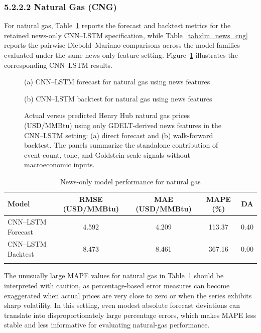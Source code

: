 \documentclass[pdflatex,sn-mathphys-num]{sn-jnl}%
\theoremstyle{thmstyleone}%
\theoremstyle{thmstyletwo}%
\theoremstyle{thmstylethree}%
\begin{document}
\subsubsection*{5.2.2.2 Natural Gas (CNG)}
For natural gas, Table~\ref{tab:news_only_cng} reports the forecast and backtest metrics for the retained news-only CNN--LSTM specification, while Table~\ref{tab:dm_news_cng} reports the pairwise Diebold--Mariano comparisons across the model families evaluated under the same news-only feature setting. Figure~\ref{fig:news_only_cng_plots} illustrates the corresponding CNN--LSTM results.

\begin{figure}[h]
\centering
\begin{minipage}[t]{0.495\textwidth}
\centering

\small (a) CNN--LSTM forecast for natural gas using news features
\end{minipage}\hfill
\begin{minipage}[t]{0.495\textwidth}
\centering

\small (b) CNN--LSTM backtest for natural gas using news features
\end{minipage}
\caption{Actual versus predicted Henry Hub natural gas prices (USD/MMBtu) using only GDELT-derived news features in the CNN--LSTM setting: (a) direct forecast and (b) walk-forward backtest. The panels summarize the standalone contribution of event-count, tone, and Goldstein-scale signals without macroeconomic inputs.}
\label{fig:news_only_cng_plots}
\end{figure}

\begin{table}[h]
\centering
\caption{News-only model performance for natural gas}
\label{tab:news_only_cng}
\begin{tabular}{@{}lcccc@{}}
\toprule
Model & RMSE (USD/MMBtu) & MAE (USD/MMBtu) & MAPE (\%) & DA \\
\midrule
CNN--LSTM Forecast & 4.592 & 4.209 & 113.37 & 0.40 \\
CNN--LSTM Backtest & 8.473 & 8.461 & 367.16 & 0.00 \\
\botrule
\end{tabular}
\end{table}

The unusually large MAPE values for natural gas in Table~\ref{tab:news_only_cng} should be interpreted with caution, as percentage-based error measures can become exaggerated when actual prices are very close to zero or when the series exhibits sharp volatility. In this setting, even modest absolute forecast deviations can translate into disproportionately large percentage errors, which makes MAPE less stable and less informative for evaluating natural-gas performance.
\end{document}
